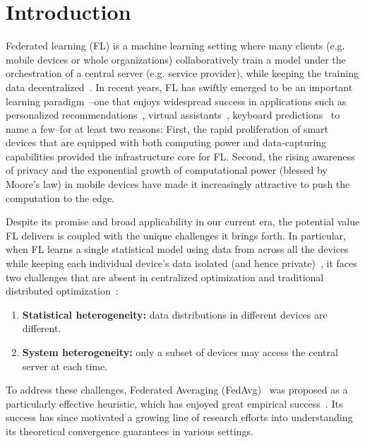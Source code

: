 

\section{Introduction}
Federated learning (FL) is a machine learning setting where many clients (e.g. mobile devices or whole organizations) collaboratively train a model under the orchestration of a central server (e.g. service provider), while keeping the training data decentralized~\cite{kairouz2019advances}.
In recent years, FL has swiftly emerged to be an important learning paradigm~\cite{mcmahan2016communication}--one that enjoys widespread success in applications such as personalized recommendations~\cite{chen2018federated}, virtual assistants~\cite{lamautonomy}, keyboard predictions~\cite{47586} to name a few--for at least two reasons: First, the rapid proliferation of smart devices that are equipped with both computing power and data-capturing capabilities provided the infrastructure core for FL. Second, the rising awareness of privacy and the exponential growth of computational power (blessed by Moore's law) in mobile devices have made it increasingly attractive to push the computation to the edge.

Despite its promise and broad applicability in our current era, the potential value FL delivers is coupled with the unique challenges it brings forth. In particular,
when FL learns a single statistical model using data from across all the devices while keeping each individual device's data isolated (and hence private)~\cite{kairouz2019advances}, it faces two challenges that are absent in centralized optimization and traditional distributed optimization~\cite{li2019convergence,smith2017federated}:
\begin{enumerate}
\item\textbf{Statistical heterogeneity:} data distributions in different devices are different.
\item\textbf{System heterogeneity:} only a subset of devices may access the central server at each time. 
\end{enumerate}

To address these challenges, Federated Averaging (FedAvg)~\cite{mcmahan2016communication} was proposed as a particularly effective heuristic, which has enjoyed great empirical success~\cite{47586}. Its success has since motivated a growing line of research efforts into understanding its theoretical convergence guarantees in various settings.

